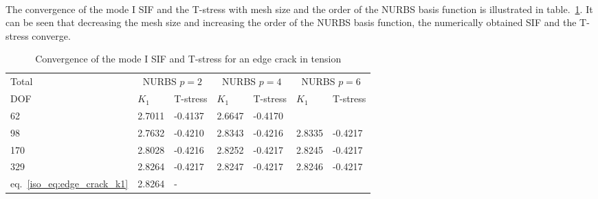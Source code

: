 \paragraph{}
The convergence of the mode I SIF and the T-stress with mesh size and the order of the NURBS basis function is illustrated in table.~\ref{iso_tab:edge_crack_res}.
It can be seen that decreasing the mesh size and increasing the order of the NURBS basis function, the numerically obtained SIF and the T-stress converge.
\begin{table}
    \caption{Convergence of the mode I SIF and T-stress for an edge crack in tension}
    \label{iso_tab:edge_crack_res}
    \begin{tabularx}{\textwidth}{XXXXXXX}
        \toprule
            Total    &   \multicolumn{2}{c}{NURBS $p=2$} &\multicolumn{2}{c}{NURBS $p=4$} &\multicolumn{2}{c}{NURBS $p=6$}\\
            \cmidrule{2-7}
            DOF      &   $K_1$   &   T-stress            &$K_1$   &   T-stress            &$K_1$   &   T-stress           \\
            \cmidrule{1-1} \cmidrule{2-3} \cmidrule{4-5} \cmidrule{6-7}
            62       &   2.7011  &   -0.4137             &2.6647  &-0.4170                &        &                      \\
            98       &   2.7632  &   -0.4210             &2.8343  &-0.4216                &2.8335  &-0.4217               \\
            170      &   2.8028  &   -0.4216             &2.8252  &-0.4217                &2.8245  &-0.4217               \\
            329      &   2.8264  &   -0.4217             &2.8247  &-0.4217                &2.8246  &-0.4217               \\
            eq.~\ref{iso_eq:edge_crack_k1} & 2.8264 & - & & & & \\
        \bottomrule
        \end{tabularx}
\end{table}

\pagebreak